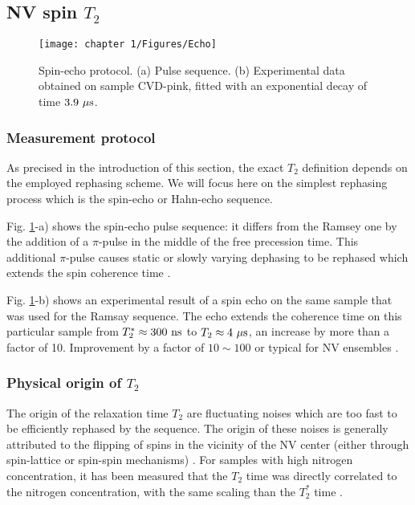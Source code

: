 \documentclass[a4paper, 11pt]{report}
\begin{document}
\subsection{NV spin $T_2$}
\label{sec T2 echo}
\begin{figure}[h!]
\centering
\texttt{[image: chapter 1/Figures/Echo]}
\caption{Spin-echo protocol. (a) Pulse sequence. (b) Experimental data obtained on sample CVD-pink, fitted with an exponential decay of time $3.9\ \rm{\mu s}$.} 
\label{Echo}
\end{figure}
\subsubsection{Measurement protocol}
As precised in the introduction of this section, the exact $T_2$ definition depends on the employed rephasing scheme. We will focus here on the simplest rephasing process which is the spin-echo or Hahn-echo sequence.

Fig. \ref{Echo}-a) shows the spin-echo pulse sequence: it differs from the Ramsey one by the addition of a $\pi$-pulse in the middle of the free precession time. This additional $\pi$-pulse causes static or slowly varying dephasing to be rephased which extends the spin coherence time \citep{hahn1950spin}. 

Fig. \ref{Echo}-b) shows an experimental result of a spin echo on the same sample that was used for the Ramsay sequence. The echo extends the coherence time on this particular sample from $T_2^* \approx 300\ \rm ns$ to $T_2 \approx 4\ \rm{\mu s}$, an increase by more than a factor of 10. Improvement by a factor of $10 \sim 100$ or typical for NV ensembles \citep{barry2020sensitivity}. %

\subsubsection{Physical origin of $T_2$}
The origin of the relaxation time $T_2$ are fluctuating noises which are too fast to be efficiently rephased by the sequence. The origin of these noises is generally attributed to the flipping of spins in the vicinity of the NV center (either through spin-lattice or spin-spin mechanisms) \citep{hall2014analytic}. For samples with high nitrogen concentration, it has been measured that the $T_2$ time was directly correlated to the nitrogen concentration, with the same scaling than the $T_2^*$ time \citep{bauch2020decoherence}.
\end{document}
